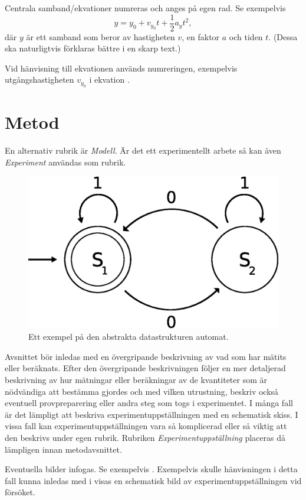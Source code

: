 \documentclass[a4paper,nologo]{miunart} %
\begin{document}
Centrala samband/ekvationer numreras och anges på egen rad.
Se exempelvis
\begin{equation}
	\label{eq:long-equation}
	y = y_0 + v_{y_0}t + \frac{1}{2}a_yt^2,
\end{equation}
där \(y\) är ett samband som beror av hastigheten \(v\), en faktor \(a\) och 
tiden \(t\).
(Dessa ska naturligtvis förklaras bättre i en skarp text.)

Vid hänvisning till ekvationen används numreringen, exempelvis 
utgångshastigheten \(v_{y_0}\) i ekvation .


\section{Metod}
\label{sec:method}
En alternativ rubrik är \emph{Modell}.
Är det ett experimentellt arbete så kan även \emph{Experiment} användas som 
rubrik.

\begin{figure}
	\centering
	\includegraphics[width=0.7\linewidth]{automata.eps}
	\caption{Ett exempel på den abstrakta datastrukturen automat.}
	\label{fig:automata}
\end{figure}

Avsnittet bör inledas med en övergripande beskrivning av vad som har mätits 
eller beräknats.
Efter den övergripande beskrivningen följer en mer detaljerad beskrivning av 
hur mätningar eller beräkningar av de kvantiteter som är nödvändiga att 
bestämma gjordes och med vilken utrustning, beskriv också eventuell 
provpreparering eller andra steg som togs i experimentet.
I många fall är det lämpligt att beskriva experimentuppställningen med en 
schematisk skiss.
I vissa fall kan experimentuppställningen vara så komplicerad eller så viktig 
att den beskrivs under egen rubrik.
Rubriken \emph{Experimentuppställning} placeras då lämpligen innan 
metodavsnittet.

Eventuella bilder infogas.
Se exempelvis .
Exempelvis skulle hänvisningen i detta fall kunna inledas med 
i  visas en schematisk bild av experimentuppställningen 
vid försöket.
\end{document}
